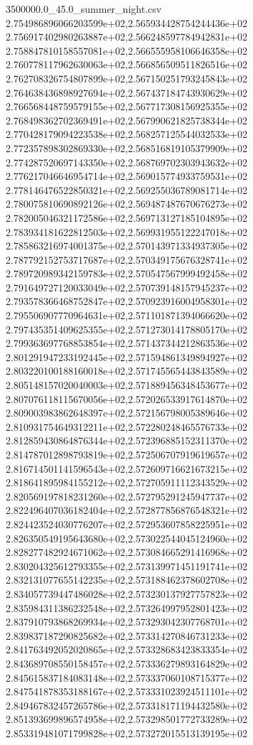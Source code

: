\begin{filecontents*}{3500000.0_45.0_summer_night.csv}
2.754986896066203599e+02,2.565934428754244436e+02
2.756917402980263887e+02,2.566248597784942831e+02
2.758847810158557081e+02,2.566555958106646358e+02
2.760778117962630063e+02,2.566856509511826516e+02
2.762708326754807899e+02,2.567150251793245843e+02
2.764638436898927694e+02,2.567437184743930629e+02
2.766568448759579155e+02,2.567717308156925355e+02
2.768498362702369491e+02,2.567990621825738344e+02
2.770428179094223538e+02,2.568257125544032533e+02
2.772357898302869330e+02,2.568516819105379909e+02
2.774287520697143350e+02,2.568769702303943632e+02
2.776217046646954714e+02,2.569015774933759531e+02
2.778146476522850321e+02,2.569255036789081714e+02
2.780075810690892126e+02,2.569487487670676273e+02
2.782005046321172586e+02,2.569713127185104895e+02
2.783934181622812503e+02,2.569931955122247018e+02
2.785863216974001375e+02,2.570143971334937305e+02
2.787792152753717687e+02,2.570349175676328741e+02
2.789720989342159783e+02,2.570547567999492458e+02
2.791649727120033049e+02,2.570739148157945237e+02
2.793578366468752847e+02,2.570923916004958301e+02
2.795506907770964631e+02,2.571101871394066620e+02
2.797435351409625355e+02,2.571273014178805170e+02
2.799363697768853854e+02,2.571437344212863536e+02
2.801291947233192445e+02,2.571594861349894927e+02
2.803220100188160018e+02,2.571745565443843589e+02
2.805148157020040003e+02,2.571889456348453677e+02
2.807076118115670056e+02,2.572026533917614870e+02
2.809003983862648397e+02,2.572156798005389646e+02
2.810931754649312211e+02,2.572280248465576733e+02
2.812859430864876344e+02,2.572396885152311370e+02
2.814787012898793819e+02,2.572506707919619657e+02
2.816714501141596543e+02,2.572609716621673215e+02
2.818641895984155212e+02,2.572705911112343529e+02
2.820569197818231260e+02,2.572795291245947737e+02
2.822496407036182404e+02,2.572877856876548321e+02
2.824423524030776207e+02,2.572953607858225951e+02
2.826350549195643680e+02,2.573022544045124960e+02
2.828277482924671062e+02,2.573084665291416968e+02
2.830204325612793355e+02,2.573139971451191741e+02
2.832131077655142235e+02,2.573188462378602708e+02
2.834057739447486028e+02,2.573230137927757823e+02
2.835984311386232548e+02,2.573264997952801423e+02
2.837910793868269934e+02,2.573293042307768701e+02
2.839837187290825682e+02,2.573314270846731233e+02
2.841763492052020865e+02,2.573328683423833354e+02
2.843689708550158457e+02,2.573336279893164829e+02
2.845615837184083148e+02,2.573337060108715377e+02
2.847541878353188167e+02,2.573331023924511101e+02
2.849467832457265786e+02,2.573318171194432580e+02
2.851393699896574958e+02,2.573298501772733289e+02
2.853319481071799828e+02,2.573272015513139195e+02

\end{filecontents*}
